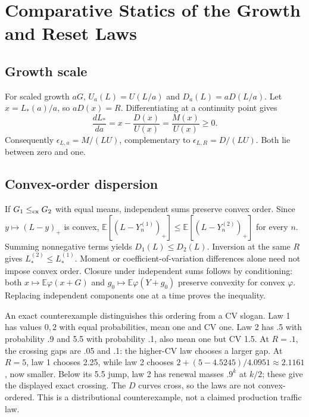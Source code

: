 \documentclass[sigconf,screen,nonacm]{acmart}
\newcommand{\E}{\mathbb{E}}
\begin{document}
\section{Comparative Statics of the Growth and Reset Laws}
\label{app:comparative}

\subsection{Growth scale}
For scaled growth $aG$, $U_a(L)=U(L/a)$ and $D_a(L)=aD(L/a)$. Let
$x=L_*(a)/a$, so $aD(x)=R$. Differentiating at a continuity point gives
\begin{equation}
\frac{dL_*}{da}=x-\frac{D(x)}{U(x)}=\frac{M(x)}{U(x)}\ge0.
\end{equation}
Consequently $\epsilon_{L,a}=M/(LU)$, complementary to
$\epsilon_{L,R}=D/(LU)$. Both lie between zero and one.

\subsection{Convex-order dispersion}
If $G_1\le_{\rm cx}G_2$ with equal means, independent sums preserve convex
order. Since $y\mapsto(L-y)_+$ is convex,
$\E[(L-Y_n^{(1)})_+]\le\E[(L-Y_n^{(2)})_+]$ for every $n$. Summing
nonnegative terms yields $D_1(L)\le D_2(L)$. Inversion at the same $R$ gives
$L_*^{(2)}\le L_*^{(1)}$. Moment or coefficient-of-variation differences
alone need not impose convex order. Closure under independent sums follows
by conditioning: both $x\mapsto\E\varphi(x+G)$ and
$g_0\mapsto\E\varphi(Y+g_0)$ preserve convexity for convex $\varphi$.
Replacing independent components one at a time proves the inequality.

An exact counterexample distinguishes this ordering from a CV slogan.
Law 1 has values $0,2$ with equal probabilities, mean one and CV one.
Law 2 has .5 with probability .9 and 5.5 with probability .1, also mean
one but CV 1.5. At $R=.1$, the crossing gaps are .05 and .1: the
higher-CV law chooses a larger gap. At $R=5$, law 1 chooses 2.25,
while law 2 chooses
$2+(5-4.5245)/4.0951\approx2.1161$, now smaller.
Below its 5.5 jump, law 2 has renewal masses $.9^k$ at $k/2$;
these give the displayed exact crossing. The $D$ curves cross, so the
laws are not convex-ordered. This is a distributional counterexample,
not a claimed production traffic law.
\end{document}
